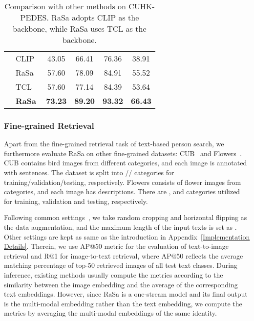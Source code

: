 \documentclass{article}
\begin{document}
\begin{table}[t]
\begin{tabular}{c|l|cccc}
\cline{2-6}
                                               & CLIP~\cite{radford2021learning}     & 43.05 & 66.41 & 76.36 & 38.91  \\
                                               & RaSa                   & 57.60 & 78.09 & 84.91 & 55.52  \\
                                               & TCL~\cite{yang2022vision}           & 57.60 & 77.14 & 84.39 & 53.64  \\
                                               & \textbf{RaSa}   & \textbf{73.23} & \textbf{89.20} & \textbf{93.32} & \textbf{66.43}  \\
\hline
\end{tabular}
\caption{Comparison with other methods on CUHK-PEDES. RaSa adopts CLIP as the backbone, while RaSa uses TCL as the backbone.}
\label{table8}
\end{table}

\subsubsection{Fine-grained Retrieval}
Apart from the fine-grained retrieval task of text-based person search, we furthermore evaluate RaSa on other fine-grained datasets: CUB~\cite{reed2016learning} and Flowers~\cite{reed2016learning}.
CUB contains  bird images from  different categories, and each image is annotated with  sentences. The dataset is split into // categories for training/validation/testing, respectively.
Flowers consists of  flower images from  categories, and each image has  descriptions. There are ,  and  categories utilized for training, validation and testing, respectively.

Following common settings~\cite{reed2016learning,sarafianos2019adversarial}, we take random cropping and horizontal flipping as the data augmentation, and the maximum length of the input texts is set as .
Other settings are kept as same as the introduction in Appendix~\ref{Implementation Details}.
Therein, we use AP@50 metric for the evaluation of text-to-image retrieval and R@1 for image-to-text retrieval, where AP@50 reflects the average matching percentage of top-50 retrieved images of all test text classes.
During inference, existing methods usually compute the metrics according to the similarity between the image embedding and the average of the corresponding text embeddings.
However, since RaSa is a one-stream model and its final output is the multi-modal embedding rather than the text embedding, we compute the metrics by averaging the multi-modal embeddings of the same identity.
\end{document}
